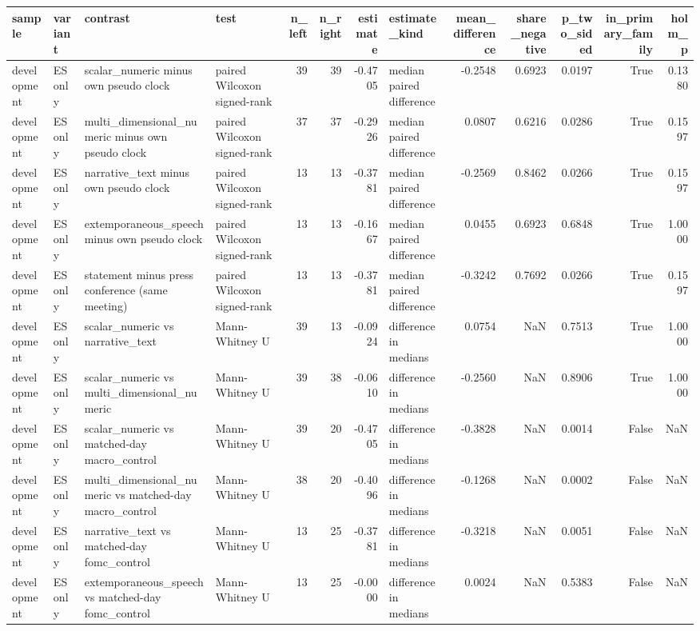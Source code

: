 \begin{tabular}{llllrrrlrrrrr}
\toprule
sample & variant & contrast & test & n_left & n_right & estimate & estimate_kind & mean_difference & share_negative & p_two_sided & in_primary_family & holm_p \\
\midrule
development & ES only & scalar_numeric minus own pseudo clock & paired Wilcoxon signed-rank & 39 & 39 & -0.4705 & median paired difference & -0.2548 & 0.6923 & 0.0197 & True & 0.1380 \\
development & ES only & multi_dimensional_numeric minus own pseudo clock & paired Wilcoxon signed-rank & 37 & 37 & -0.2926 & median paired difference & 0.0807 & 0.6216 & 0.0286 & True & 0.1597 \\
development & ES only & narrative_text minus own pseudo clock & paired Wilcoxon signed-rank & 13 & 13 & -0.3781 & median paired difference & -0.2569 & 0.8462 & 0.0266 & True & 0.1597 \\
development & ES only & extemporaneous_speech minus own pseudo clock & paired Wilcoxon signed-rank & 13 & 13 & -0.1667 & median paired difference & 0.0455 & 0.6923 & 0.6848 & True & 1.0000 \\
development & ES only & statement minus press conference (same meeting) & paired Wilcoxon signed-rank & 13 & 13 & -0.3781 & median paired difference & -0.3242 & 0.7692 & 0.0266 & True & 0.1597 \\
development & ES only & scalar_numeric vs narrative_text & Mann-Whitney U & 39 & 13 & -0.0924 & difference in medians & 0.0754 & NaN & 0.7513 & True & 1.0000 \\
development & ES only & scalar_numeric vs multi_dimensional_numeric & Mann-Whitney U & 39 & 38 & -0.0610 & difference in medians & -0.2560 & NaN & 0.8906 & True & 1.0000 \\
development & ES only & scalar_numeric vs matched-day macro_control & Mann-Whitney U & 39 & 20 & -0.4705 & difference in medians & -0.3828 & NaN & 0.0014 & False & NaN \\
development & ES only & multi_dimensional_numeric vs matched-day macro_control & Mann-Whitney U & 38 & 20 & -0.4096 & difference in medians & -0.1268 & NaN & 0.0002 & False & NaN \\
development & ES only & narrative_text vs matched-day fomc_control & Mann-Whitney U & 13 & 25 & -0.3781 & difference in medians & -0.3218 & NaN & 0.0051 & False & NaN \\
development & ES only & extemporaneous_speech vs matched-day fomc_control & Mann-Whitney U & 13 & 25 & -0.0000 & difference in medians & 0.0024 & NaN & 0.5383 & False & NaN \\

\end{tabular}
